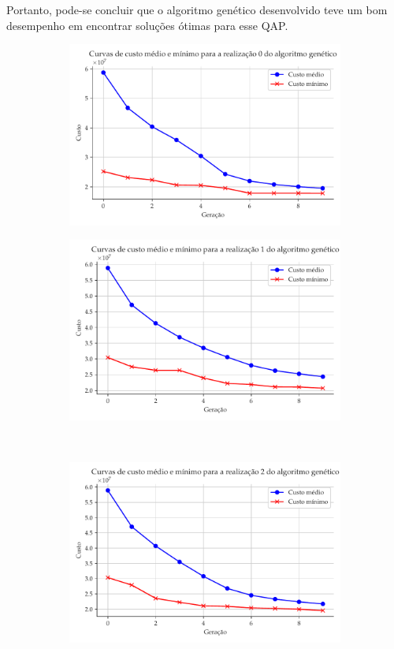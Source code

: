 \documentclass[a4paper, 12pt]{article}
\begin{document}
Portanto, pode-se concluir que o algoritmo genético desenvolvido teve um bom desempenho em encontrar soluções ótimas para esse QAP.
\begin{figure}[!ht]
\centering
\begin{subfigure}{0.4\textwidth}
    \includegraphics[width=\textwidth]{figuras/realizacao-0.pdf}
\end{subfigure}
\begin{subfigure}{0.4\textwidth}
    \includegraphics[width=\textwidth]{figuras/realizacao-1.pdf}
\end{subfigure}
\hfill
\\
\centering
\begin{subfigure}{0.4\textwidth}
    \includegraphics[width=\textwidth]{figuras/realizacao-2.pdf}

\end{subfigure}
\end{figure}
\end{document}
